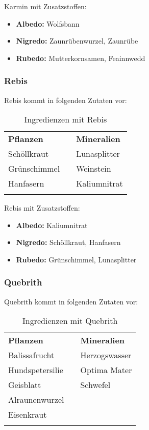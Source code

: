 Karmin mit Zusatzstoffen:
\begin{itemize}
\item \textbf{Albedo:} Wolfsbann
\item \textbf{Nigredo:} Zaunrübenwurzel, Zaunrübe
\item \textbf{Rubedo:} Mutterkornsamen, Feainnwedd
\end{itemize}


\subsubsection{Rebis}
Rebis kommt in folgenden Zutaten vor:
\begin{longtable}{p{5cm}p{2cm}p{5cm}}
\textbf{Pflanzen} & & \textbf{Mineralien} \\ \cline{1-1} \cline{3-3}
Schöllkraut & & Lunasplitter \\
Grünschimmel & & Weinstein \\
Hanfasern & & Kaliumnitrat \\

\caption{Ingredienzen mit Rebis}
\label{tab:ingredienzen_mit_rebis}
\end{longtable}

Rebis mit Zusatzstoffen:
\begin{itemize}
\item \textbf{Albedo:} Kaliumnitrat
\item \textbf{Nigredo:} Schöllkraut, Hanfasern
\item \textbf{Rubedo:} Grünschimmel, Lunasplitter
\end{itemize}


\subsubsection{Quebrith}
Quebrith kommt in folgenden Zutaten vor:
\begin{longtable}{p{5cm}p{2cm}p{5cm}}
\textbf{Pflanzen} & & \textbf{Mineralien} \\ \cline{1-1} \cline{3-3}
Balissafrucht & & Herzogswasser \\
Hundspetersilie & & Optima Mater \\
Geisblatt & & Schwefel \\
Alraunenwurzel & & \\
Eisenkraut & & \\

\caption{Ingredienzen mit Quebrith}
\label{tab:ingredienzen_mit_quebrith}
\end{longtable}

